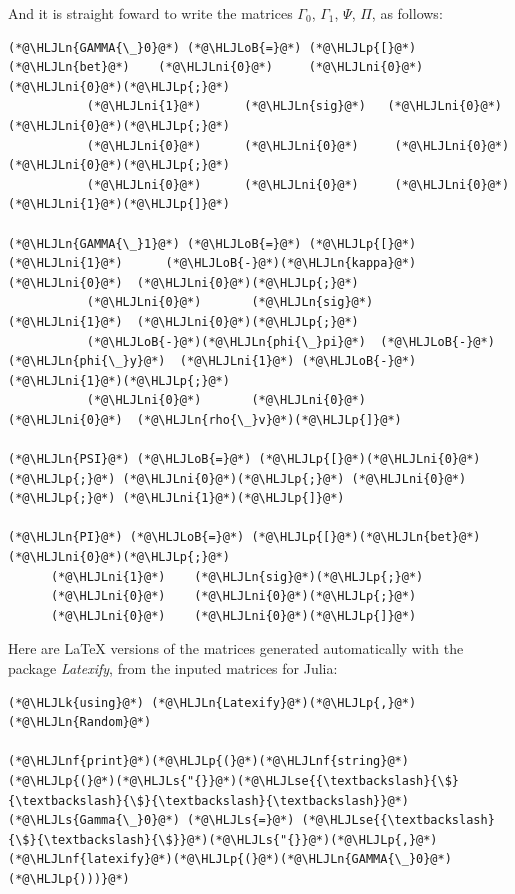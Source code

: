 \documentclass[12pt,a4paper]{article}
\newcommand{\HLJLk}[1]{\textcolor[RGB]{148,91,176}{\textbf{#1}}}
\newcommand{\HLJLn}[1]{#1}
\newcommand{\HLJLnf}[1]{\textcolor[RGB]{66,102,213}{#1}}
\newcommand{\HLJLs}[1]{\textcolor[RGB]{201,61,57}{#1}}
\newcommand{\HLJLse}[1]{\textcolor[RGB]{59,151,46}{#1}}
\newcommand{\HLJLni}[1]{\textcolor[RGB]{59,151,46}{#1}}
\newcommand{\HLJLoB}[1]{\textcolor[RGB]{102,102,102}{\textbf{#1}}}
\newcommand{\HLJLp}[1]{#1}
\begin{document}
And it is straight foward to write the matrices $\Gamma_0$, $\Gamma_1$, $\Psi$, $\Pi$, as follows:


\begin{lstlisting}
(*@\HLJLn{GAMMA{\_}0}@*) (*@\HLJLoB{=}@*) (*@\HLJLp{[}@*)(*@\HLJLn{bet}@*)    (*@\HLJLni{0}@*)     (*@\HLJLni{0}@*)  (*@\HLJLni{0}@*)(*@\HLJLp{;}@*)
           (*@\HLJLni{1}@*)      (*@\HLJLn{sig}@*)   (*@\HLJLni{0}@*)  (*@\HLJLni{0}@*)(*@\HLJLp{;}@*)
           (*@\HLJLni{0}@*)      (*@\HLJLni{0}@*)     (*@\HLJLni{0}@*)  (*@\HLJLni{0}@*)(*@\HLJLp{;}@*)
           (*@\HLJLni{0}@*)      (*@\HLJLni{0}@*)     (*@\HLJLni{0}@*)  (*@\HLJLni{1}@*)(*@\HLJLp{]}@*)

(*@\HLJLn{GAMMA{\_}1}@*) (*@\HLJLoB{=}@*) (*@\HLJLp{[}@*)(*@\HLJLni{1}@*)      (*@\HLJLoB{-}@*)(*@\HLJLn{kappa}@*)  (*@\HLJLni{0}@*)  (*@\HLJLni{0}@*)(*@\HLJLp{;}@*)
           (*@\HLJLni{0}@*)       (*@\HLJLn{sig}@*)    (*@\HLJLni{1}@*)  (*@\HLJLni{0}@*)(*@\HLJLp{;}@*)
           (*@\HLJLoB{-}@*)(*@\HLJLn{phi{\_}pi}@*)  (*@\HLJLoB{-}@*)(*@\HLJLn{phi{\_}y}@*)  (*@\HLJLni{1}@*) (*@\HLJLoB{-}@*)(*@\HLJLni{1}@*)(*@\HLJLp{;}@*)
           (*@\HLJLni{0}@*)       (*@\HLJLni{0}@*)      (*@\HLJLni{0}@*)  (*@\HLJLn{rho{\_}v}@*)(*@\HLJLp{]}@*)

(*@\HLJLn{PSI}@*) (*@\HLJLoB{=}@*) (*@\HLJLp{[}@*)(*@\HLJLni{0}@*)(*@\HLJLp{;}@*) (*@\HLJLni{0}@*)(*@\HLJLp{;}@*) (*@\HLJLni{0}@*)(*@\HLJLp{;}@*) (*@\HLJLni{1}@*)(*@\HLJLp{]}@*)

(*@\HLJLn{PI}@*) (*@\HLJLoB{=}@*) (*@\HLJLp{[}@*)(*@\HLJLn{bet}@*)  (*@\HLJLni{0}@*)(*@\HLJLp{;}@*)
      (*@\HLJLni{1}@*)    (*@\HLJLn{sig}@*)(*@\HLJLp{;}@*)
      (*@\HLJLni{0}@*)    (*@\HLJLni{0}@*)(*@\HLJLp{;}@*)
      (*@\HLJLni{0}@*)    (*@\HLJLni{0}@*)(*@\HLJLp{]}@*)
\end{lstlisting}


Here are LaTeX versions of the matrices generated automatically with the package \emph{Latexify}, from the inputed matrices for Julia:


\begin{lstlisting}
(*@\HLJLk{using}@*) (*@\HLJLn{Latexify}@*)(*@\HLJLp{,}@*) (*@\HLJLn{Random}@*)

(*@\HLJLnf{print}@*)(*@\HLJLp{(}@*)(*@\HLJLnf{string}@*)(*@\HLJLp{(}@*)(*@\HLJLs{"{}}@*)(*@\HLJLse{{\textbackslash}{\$}{\textbackslash}{\$}{\textbackslash}{\textbackslash}}@*)(*@\HLJLs{Gamma{\_}0}@*) (*@\HLJLs{=}@*) (*@\HLJLse{{\textbackslash}{\$}{\textbackslash}{\$}}@*)(*@\HLJLs{"{}}@*)(*@\HLJLp{,}@*)(*@\HLJLnf{latexify}@*)(*@\HLJLp{(}@*)(*@\HLJLn{GAMMA{\_}0}@*)(*@\HLJLp{)))}@*)
\end{lstlisting}
\end{document}

